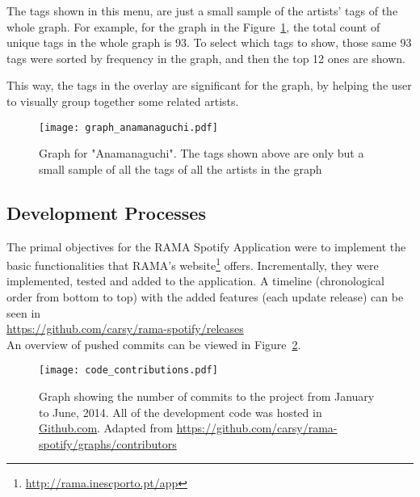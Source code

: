       The tags shown in this menu, are just a small sample of the artists' tags of the whole graph.
      For example, for the graph in the Figure~\ref{fig:graph_anamanaguchi}, the total count of unique tags in the whole graph is 93.
      To select which tags to show, those same 93 tags were sorted by frequency in the graph, and then the top 12 ones are shown.

      This way, the tags in the overlay are significant for the graph, by helping the user to visually group together some related artists.

      \begin{figure}
        \begin{center}
          \texttt{[image: graph\_anamanaguchi.pdf]}
        \end{center}
        \caption{Graph for "Anamanaguchi". The tags shown above are only but a small sample of all the tags of all the artists in the graph}
        \label{fig:graph_anamanaguchi}
      \end{figure}



  \clearpage


  \subsection{Development Processes} %
    \label{sub:development_process}

    The primal objectives for the RAMA Spotify Application were to implement the basic functionalities that RAMA's website\footnote{\url{http://rama.inescporto.pt/app}} offers.
    Incrementally, they were implemented, tested and added to the application.
    A timeline (chronological order from bottom to top) with the added features (each update release) can be seen in \\ 
    \indent \url{https://github.com/carsy/rama-spotify/releases} \\

    An overview of pushed commits can be viewed in Figure~\ref{fig:code_contributions}.

    \begin{figure}[H]
      \begin{center}
        \texttt{[image: code\_contributions.pdf]}
      \end{center}
      \caption{Graph showing the number of commits to the project from January to June, 2014. All of the development code was hosted in \url{Github.com}. Adapted from \url{https://github.com/carsy/rama-spotify/graphs/contributors}}
      \label{fig:code_contributions}
    \end{figure}

